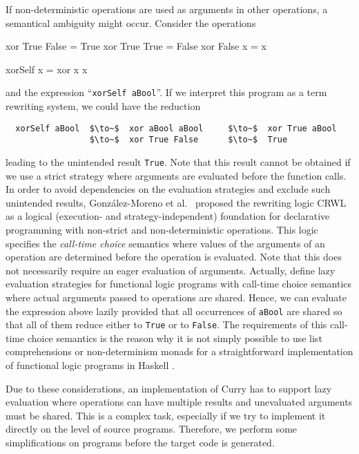 \documentclass{llncs}
\newcommand{\code}[1]{\mbox{\small\texttt{#1}}}
\newcommand{\ccode}[1]{``\code{#1}''}
\begin{document}
If non-deterministic operations are used as arguments in other operations,
a semantical ambiguity might occur. Consider the operations
%
\begin{curry}
  xor True  False = True
  xor True  True  = False
  xor False x     = x

  xorSelf x = xor x x
\end{curry}
%
and the expression \ccode{xorSelf aBool}.
If we interpret this program as a term rewriting system,
we could have the reduction
\begin{lstlisting}
  xorSelf aBool  $\to~$  xor aBool aBool     $\to~$  xor True aBool
                 $\to~$  xor True False      $\to~$  True
\end{lstlisting}
leading to the unintended result \code{True}.
Note that this result cannot be obtained if we use a strict strategy
where arguments are evaluated before the function calls.
In order to avoid dependencies on the evaluation strategies
and exclude such unintended results,
Gonz\'alez-Moreno et al.\ \cite{GonzalezEtAl99} proposed
the rewriting logic CRWL as a logical
(execution- and strategy-independent) foundation for declarative
programming with non-strict and non-deterministic operations.  This
logic specifies the \emph{call-time choice} semantics \cite{Hussmann92}
\label{ctc-semantics}
where values of the arguments of an operation are determined before the
operation is evaluated. Note that this does not necessarily require
an eager evaluation of arguments.
Actually, \cite{AlbertHanusHuchOliverVidal05,LopezRodriguezSanchez07}
define lazy evaluation strategies for functional logic programs
with call-time choice semantics where actual arguments passed to
operations are shared. Hence, we can evaluate the expression above
lazily provided that all occurrences of \code{aBool}
are shared so that all of them reduce either to \code{True} or to \code{False}.
The requirements of this call-time choice semantics is the
reason why it is not simply possible to use list comprehensions
or non-determinism monads for a straightforward implementation
of functional logic programs in Haskell \cite{FischerKiselyovShan09}.

Due to these considerations, an implementation of Curry
has to support lazy evaluation where operations can have multiple results
and unevaluated arguments must be shared.
This is a complex task, especially if we try to implement it directly
on the level of source programs. Therefore, we perform some
simplifications on programs before the target code is generated.
\end{document}
